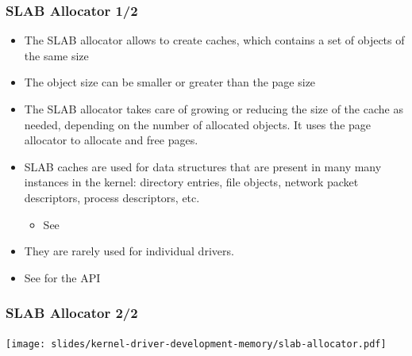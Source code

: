 \begin{frame}
  \frametitle{SLAB Allocator 1/2}
  \begin{itemize}
  \item The SLAB allocator allows to create caches, which contains a
    set of objects of the same size
  \item The object size can be smaller or greater than the page size
  \item The SLAB allocator takes care of growing or reducing the size
    of the cache as needed, depending on the number of allocated
    objects. It uses the page allocator to allocate and free pages.
  \item SLAB caches are used for data structures that are present in
    many many instances in the kernel: directory entries, file
    objects, network packet descriptors, process descriptors, etc.
    \begin{itemize}
    \item See 
    \end{itemize}
  \item They are rarely used for individual drivers.
  \item See  for the API
\end{itemize}
\end{frame}

\begin{frame}
  \frametitle{SLAB Allocator 2/2}
  \begin{center}
    \texttt{[image: slides/kernel-driver-development-memory/slab-allocator.pdf]}
  \end{center}
\end{frame}

